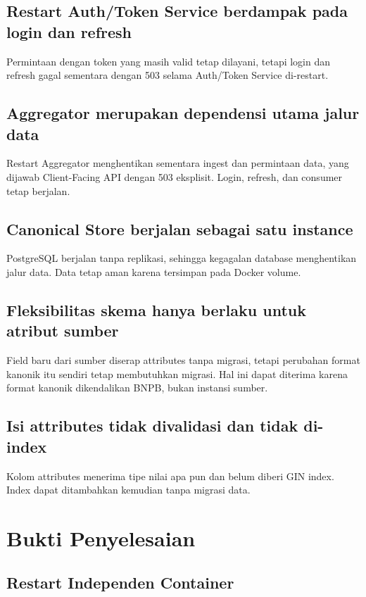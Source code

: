 \subsection{Restart Auth/Token Service berdampak pada login dan refresh}

Permintaan dengan token yang masih valid tetap dilayani, tetapi login dan refresh gagal sementara dengan 503 selama Auth/Token Service di-restart.

\subsection{Aggregator merupakan dependensi utama jalur data}

Restart Aggregator menghentikan sementara ingest dan permintaan data, yang dijawab Client-Facing API dengan 503 eksplisit. Login, refresh, dan consumer tetap berjalan.

\subsection{Canonical Store berjalan sebagai satu instance}

PostgreSQL berjalan tanpa replikasi, sehingga kegagalan database menghentikan jalur data. Data tetap aman karena tersimpan pada Docker volume.

\subsection{Fleksibilitas skema hanya berlaku untuk atribut sumber}

Field baru dari sumber diserap attributes tanpa migrasi, tetapi perubahan format kanonik itu sendiri tetap membutuhkan migrasi. Hal ini dapat diterima karena format kanonik dikendalikan BNPB, bukan instansi sumber.

\subsection{Isi attributes tidak divalidasi dan tidak di-index}\label{sec:p4-attributes}

Kolom attributes menerima tipe nilai apa pun dan belum diberi GIN index. Index dapat ditambahkan kemudian tanpa migrasi data.

\section{Bukti Penyelesaian}

\subsection{Restart Independen Container}

